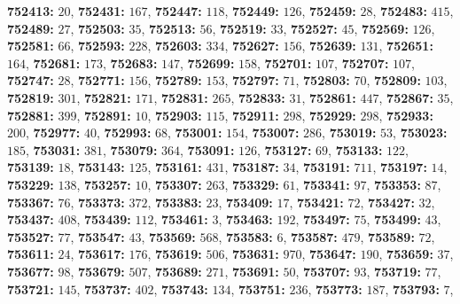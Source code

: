 \textsf{\bfseries 752413:} $20$, \textsf{\bfseries 752431:} $167$, \textsf{\bfseries 752447:} $118$, \textsf{\bfseries 752449:} $126$, \textsf{\bfseries 752459:} $28$, \textsf{\bfseries 752483:} $415$, \textsf{\bfseries 752489:} $27$, \textsf{\bfseries 752503:} $35$, \textsf{\bfseries 752513:} $56$, \textsf{\bfseries 752519:} $33$, \textsf{\bfseries 752527:} $45$, \textsf{\bfseries 752569:} $126$, \textsf{\bfseries 752581:} $66$, \textsf{\bfseries 752593:} $228$, \textsf{\bfseries 752603:} $334$, \textsf{\bfseries 752627:} $156$, \textsf{\bfseries 752639:} $131$, \textsf{\bfseries 752651:} $164$, \textsf{\bfseries 752681:} $173$, \textsf{\bfseries 752683:} $147$, \textsf{\bfseries 752699:} $158$, \textsf{\bfseries 752701:} $107$, \textsf{\bfseries 752707:} $107$, \textsf{\bfseries 752747:} $28$, \textsf{\bfseries 752771:} $156$, \textsf{\bfseries 752789:} $153$, \textsf{\bfseries 752797:} $71$, \textsf{\bfseries 752803:} $70$, \textsf{\bfseries 752809:} $103$, \textsf{\bfseries 752819:} $301$, \textsf{\bfseries 752821:} $171$, \textsf{\bfseries 752831:} $265$, \textsf{\bfseries 752833:} $31$, \textsf{\bfseries 752861:} $447$, \textsf{\bfseries 752867:} $35$, \textsf{\bfseries 752881:} $399$, \textsf{\bfseries 752891:} $10$, \textsf{\bfseries 752903:} $115$, \textsf{\bfseries 752911:} $298$, \textsf{\bfseries 752929:} $298$, \textsf{\bfseries 752933:} $200$, \textsf{\bfseries 752977:} $40$, \textsf{\bfseries 752993:} $68$, \textsf{\bfseries 753001:} $154$, \textsf{\bfseries 753007:} $286$, \textsf{\bfseries 753019:} $53$, \textsf{\bfseries 753023:} $185$, \textsf{\bfseries 753031:} $381$, \textsf{\bfseries 753079:} $364$, \textsf{\bfseries 753091:} $126$, \textsf{\bfseries 753127:} $69$, \textsf{\bfseries 753133:} $122$, \textsf{\bfseries 753139:} $18$, \textsf{\bfseries 753143:} $125$, \textsf{\bfseries 753161:} $431$, \textsf{\bfseries 753187:} $34$, \textsf{\bfseries 753191:} $711$, \textsf{\bfseries 753197:} $14$, \textsf{\bfseries 753229:} $138$, \textsf{\bfseries 753257:} $10$, \textsf{\bfseries 753307:} $263$, \textsf{\bfseries 753329:} $61$, \textsf{\bfseries 753341:} $97$, \textsf{\bfseries 753353:} $87$, \textsf{\bfseries 753367:} $76$, \textsf{\bfseries 753373:} $372$, \textsf{\bfseries 753383:} $23$, \textsf{\bfseries 753409:} $17$, \textsf{\bfseries 753421:} $72$, \textsf{\bfseries 753427:} $32$, \textsf{\bfseries 753437:} $408$, \textsf{\bfseries 753439:} $112$, \textsf{\bfseries 753461:} $3$, \textsf{\bfseries 753463:} $192$, \textsf{\bfseries 753497:} $75$, \textsf{\bfseries 753499:} $43$, \textsf{\bfseries 753527:} $77$, \textsf{\bfseries 753547:} $43$, \textsf{\bfseries 753569:} $568$, \textsf{\bfseries 753583:} $6$, \textsf{\bfseries 753587:} $479$, \textsf{\bfseries 753589:} $72$, \textsf{\bfseries 753611:} $24$, \textsf{\bfseries 753617:} $176$, \textsf{\bfseries 753619:} $506$, \textsf{\bfseries 753631:} $970$, \textsf{\bfseries 753647:} $190$, \textsf{\bfseries 753659:} $37$, \textsf{\bfseries 753677:} $98$, \textsf{\bfseries 753679:} $507$, \textsf{\bfseries 753689:} $271$, \textsf{\bfseries 753691:} $50$, \textsf{\bfseries 753707:} $93$, \textsf{\bfseries 753719:} $77$, \textsf{\bfseries 753721:} $145$, \textsf{\bfseries 753737:} $402$, \textsf{\bfseries 753743:} $134$, \textsf{\bfseries 753751:} $236$, \textsf{\bfseries 753773:} $187$, \textsf{\bfseries 753793:} $7$, 
